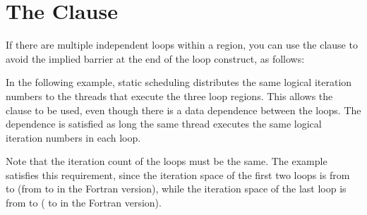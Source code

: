 \pagebreak
\section{The  Clause}
\label{sec:nowait}

If there are multiple independent loops within a  region, you 
can use the  clause to avoid the implied barrier at the end of the 
loop construct, as follows:



In the following example, static scheduling distributes the same logical iteration 
numbers to the threads that execute the three loop regions. This allows the  
clause to be used, even though there is a data dependence between the loops. The 
dependence is satisfied as long the same thread executes the same logical iteration 
numbers in each loop.

Note that the iteration count of the loops must be the same. The example satisfies 
this requirement, since the iteration space of the first two loops is from  
to  (from  to  in the Fortran version), while the 
iteration space of the last loop is from  to  ( to 
 in the Fortran version).



